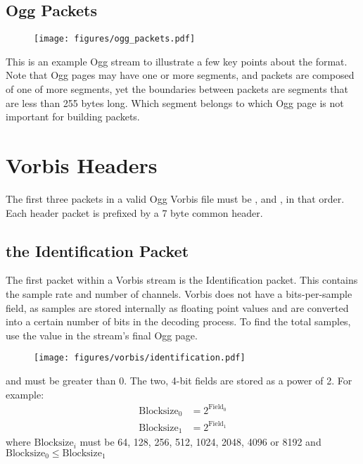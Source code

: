 \subsection{Ogg Packets}
\begin{figure}[h]
\texttt{[image: figures/ogg\_packets.pdf]}
\end{figure}
\par
\noindent
This is an example Ogg stream to illustrate a few key points about
the format.
Note that Ogg pages may have one or more segments,
and packets are composed of one of more segments,
yet the boundaries between packets are segments
that are less than 255 bytes long.
Which segment belongs to which Ogg page is not important
for building packets.

\section{Vorbis Headers}

The first three packets in a valid Ogg Vorbis file must be
,  and , in that order.
Each header packet is prefixed by a 7 byte common header.

\clearpage

\subsection{the Identification Packet}
The first packet within a Vorbis stream is the Identification packet.
This contains the sample rate and number of channels.
Vorbis does not have a bits-per-sample field, as samples
are stored internally as floating point values and are
converted into a certain number of bits in the decoding process.
To find the total samples, use the  value
in the stream's final Ogg page.
\begin{figure}[h]
\texttt{[image: figures/vorbis/identification.pdf]}
\end{figure}
\par
\noindent
{} and  must be greater than 0.
The two, 4-bit  fields are stored as a power of 2.
For example:
\begin{align*}
\text{Blocksize}_0 &= 2 ^ {\text{Field}_0} \\
\text{Blocksize}_1 &= 2 ^ {\text{Field}_1}
\end{align*}
where $\text{Blocksize}_i$ must be 64, 128, 256, 512, 1024, 2048, 4096 or 8192
and
\linebreak
$\text{Blocksize}_0 \leq \text{Blocksize}_1$

